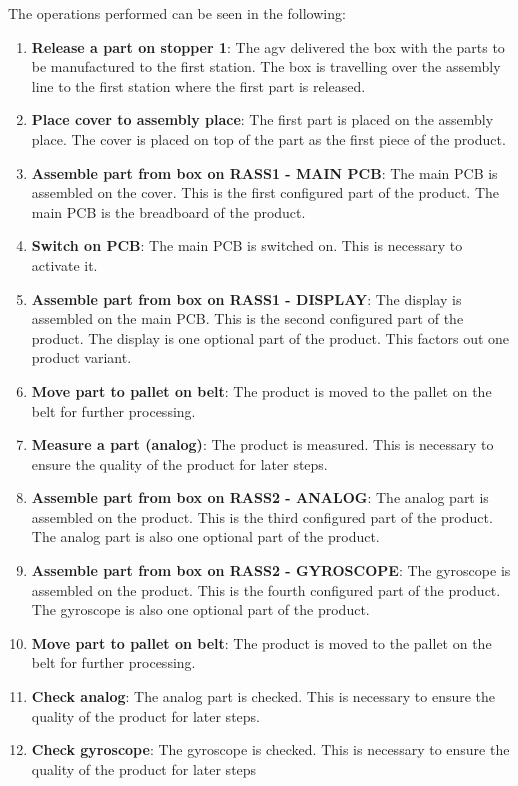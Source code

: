 The operations performed can be seen in the following:

\begin{enumerate}
    \item \textbf{Release a part on stopper 1}: The \gls{agv} delivered the box with the parts to be manufactured to the first station. The box is travelling over the assembly line to the first station where the first part is released.
    \item \textbf{Place cover to assembly place}: The first part is placed on the assembly place. The cover is placed on top of the part as the first piece of the product.
    \item \textbf{Assemble part from box on RASS1 - MAIN PCB}: The main PCB is assembled on the cover. This is the first configured part of the product. The main PCB is the breadboard of the product.
    \item \textbf{Switch on PCB}: The main PCB is switched on. This is necessary to activate it.
    \item \textbf{Assemble part from box on RASS1 - DISPLAY}: The display is assembled on the main PCB. This is the second configured part of the product. The display is one optional part of the product. This factors out one product variant.
    \item \textbf{Move part to pallet on belt}: The product is moved to the pallet on the belt for further processing.
    \item \textbf{Measure a part (analog)}: The product is measured. This is necessary to ensure the quality of the product for later steps.
    \item \textbf{Assemble part from box on RASS2 - ANALOG}: The analog part is assembled on the product. This is the third configured part of the product. The analog part is also one optional part of the product.
    \item \textbf{Assemble part from box on RASS2 - GYROSCOPE}: The gyroscope is assembled on the product. This is the fourth configured part of the product. The gyroscope is also one optional part of the product.
    \item \textbf{Move part to pallet on belt}: The product is moved to the pallet on the belt for further processing.
    \item \textbf{Check analog}: The analog part is checked. This is necessary to ensure the quality of the product for later steps.
    \item \textbf{Check gyroscope}: The gyroscope is checked. This is necessary to ensure the quality of the product for later steps

\end{enumerate}
